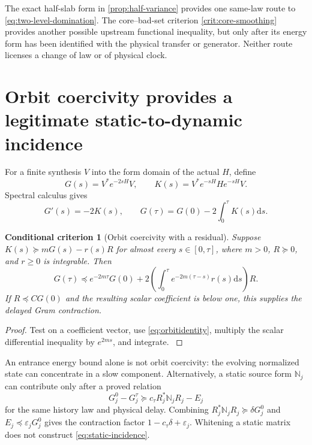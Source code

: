 \documentclass[11pt,oneside,openany]{book}
\newtheorem{criterion}[criterion]{Conditional criterion}
\theoremstyle{definition}
\theoremstyle{remark}
\newcommand{\dd}{\mathrm d}
\newcommand{\src}[2]{\cite[#2]{#1}}
\begin{document}
The exact half-slab form in \cref{prop:half-variance} provides one
same-law route to \cref{eq:two-level-domination}. The core--bad-set
criterion \cref{crit:core-smoothing} provides another possible upstream
functional inequality, but only after its energy form has been
identified with the physical transfer or generator. Neither route
licenses a change of law or of physical clock.

\section{Orbit coercivity provides a legitimate static-to-dynamic incidence}
For a finite synthesis $V$ into the form domain of the actual $H$, define
\[
G(s)=V^*e^{-2sH}V,\qquad
K(s)=V^*e^{-sH}He^{-sH}V.
\]
Spectral calculus gives
\begin{equation}\label{eq:orbitidentity}
G'(s)=-2K(s),\qquad
G(\tau)=G(0)-2\int_0^\tau K(s)\dd s.
\end{equation}

\begin{criterion}[Orbit coercivity with a residual]\label{thm:orbit}
Suppose $K(s)\succeq mG(s)-r(s)R$ for almost every $s\in[0,\tau]$, where $m>0$, $R\succeq0$, and $r\ge0$ is integrable. Then
\begin{equation}\label{eq:orbitbound}
G(\tau)\preceq e^{-2m\tau}G(0)
+2\left(\int_0^\tau e^{-2m(\tau-s)}r(s)\dd s\right)R.
\end{equation}
If $R\preceq CG(0)$ and the resulting scalar coefficient is below one, this supplies the delayed Gram contraction.
\end{criterion}
\begin{proof}
Test on a coefficient vector, use \cref{eq:orbitidentity}, multiply the scalar differential inequality by $e^{2ms}$, and integrate. \src{F1}{V2}
\end{proof}

An entrance energy bound alone is not orbit coercivity: the evolving normalized state can concentrate in a slow component. Alternatively, a static source form $\mathbb N_j$ can contribute only after a proved relation
\begin{equation}\label{eq:static-incidence}
G_j^0-G_j^\tau\succeq c_\tau R_j^*\mathbb N_jR_j-E_j
\end{equation}
for the same history law and physical delay. Combining $R_j^*\mathbb N_jR_j\succeq\delta G_j^0$ and $E_j\preceq\varepsilon_jG_j^0$ gives the contraction factor $1-c_\tau\delta+\varepsilon_j$. Whitening a static matrix does not construct \cref{eq:static-incidence}.
\end{document}

